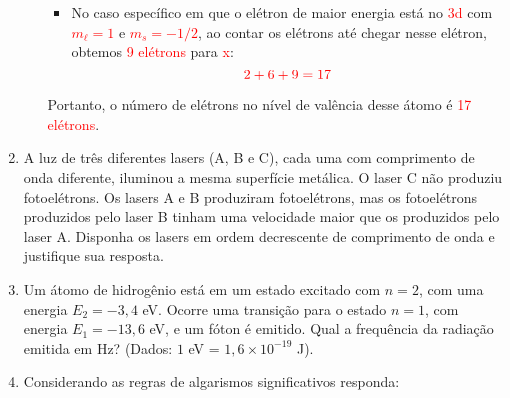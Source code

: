 \documentclass[a4paper, 12pt]{article}
\begin{document}
\begin{enumerate}
\begin{enumerate}
{\begin{itemize}
\[                                  \]
                                  Vamos distribuir os elétrons no subnível \textcolor{red}{3d} até chegar no elétron com os números quanticos dados:
                                  
                                  Como o subnível \textcolor{red}{3d} pode ter no máximo \textcolor{red}{10 elétrons}, o número de elétrons no nível de valência varia entre \textcolor{red}{8} e \textcolor{red}{18}, dependendo de \textcolor{red}{\(x\)}.
                            \item[] No caso específico em que o elétron de maior energia está no \textcolor{red}{3d} com \textcolor{red}{\( m_\ell = 1 \)} e \textcolor{red}{\( m_s = -1/2 \)}, ao contar os elétrons até chegar nesse elétron, obtemos \textcolor{red}{9 elétrons} para \textcolor{red}{x}:
                                  \[
                                      \textcolor{red}{2 + 6 + 9 = 17}
                                  \]
                        \end{itemize}
                        Portanto, o número de elétrons no nível de valência desse átomo é \textcolor{red}{17 elétrons}.
                    }
          \end{enumerate}

    \item A luz de três diferentes lasers (A, B e C), cada uma com comprimento de onda diferente, iluminou a mesma superfície metálica. O laser C não produziu fotoelétrons. Os lasers A e B produziram fotoelétrons, mas os fotoelétrons produzidos pelo laser B tinham uma velocidade maior que os produzidos pelo laser A. Disponha os lasers em ordem decrescente de comprimento de onda e justifique sua resposta.

    \item Um átomo de hidrogênio está em um estado excitado com \( n = 2 \), com uma energia \( E_2 = -3,4 \) eV. Ocorre uma transição para o estado \( n = 1 \), com energia \( E_1 = -13,6 \) eV, e um fóton é emitido. Qual a frequência da radiação emitida em Hz? (Dados: \( 1 \) eV = \( 1,6 \times 10^{-19} \) J).


    \item Considerando as regras de algarismos significativos responda:


\end{enumerate}
\end{document}
